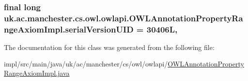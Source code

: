 \hypertarget{classuk_1_1ac_1_1manchester_1_1cs_1_1owl_1_1owlapi_1_1_o_w_l_annotation_property_range_axiom_impl_a929cdd56a29e2f960e193bd84872385e}{
\subsubsection[{serial\-Version\-U\-I\-D}]{\setlength{\rightskip}{0pt plus 5cm}final long uk.\-ac.\-manchester.\-cs.\-owl.\-owlapi.\-O\-W\-L\-Annotation\-Property\-Range\-Axiom\-Impl.\-serial\-Version\-U\-I\-D = 30406\-L\hspace{0.3cm}{\ttfamily [static]}, {\ttfamily [private]}}}\label{classuk_1_1ac_1_1manchester_1_1cs_1_1owl_1_1owlapi_1_1_o_w_l_annotation_property_range_axiom_impl_a929cdd56a29e2f960e193bd84872385e}


The documentation for this class was generated from the following file\-:\begin{DoxyCompactItemize}
\item 
impl/src/main/java/uk/ac/manchester/cs/owl/owlapi/\hyperlink{_o_w_l_annotation_property_range_axiom_impl_8java}{O\-W\-L\-Annotation\-Property\-Range\-Axiom\-Impl.\-java}\end{DoxyCompactItemize}
